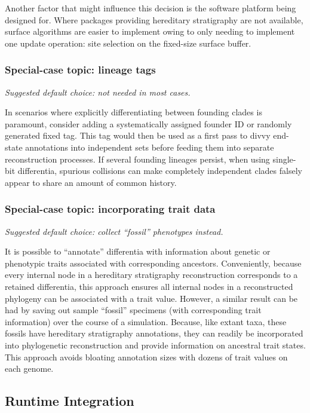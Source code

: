 Another factor that might influence this decision is the software platform being designed for.
Where packages providing hereditary stratigraphy are not available, surface algorithms are easier to implement owing to only needing to implement one update operation: site selection on the fixed-size surface buffer.

\subsubsection{Special-case topic: lineage tags}
\textit{Suggested default choice: not needed in most cases.}

In scenarios where explicitly differentiating between founding clades is paramount, consider adding a systematically assigned founder ID or randomly generated fixed tag.
This tag would then be used as a first pass to divvy end-state annotations into independent sets before feeding them into separate reconstruction processes.
If several founding lineages persist, when using single-bit differentia, spurious collisions can make completely independent clades falsely appear to share an amount of common history.

\subsubsection{Special-case topic: incorporating trait data}
\textit{Suggested default choice: collect ``fossil'' phenotypes instead.}

It is possible to ``annotate'' differentia with information about genetic or phenotypic traits associated with corresponding ancestors.
Conveniently, because every internal node in a hereditary stratigraphy reconstruction corresponds to a retained differentia, this approach ensures all internal nodes in a reconstructed phylogeny can be associated with a trait value.
However, a similar result can be had by saving out sample ``fossil'' specimens (with corresponding trait information) over the course of a simulation.
Because, like extant taxa, these fossils have hereditary stratigraphy annotations, they can readily be incorporated into phylogenetic reconstruction and provide information on ancestral trait states.
This approach avoids bloating annotation sizes with dozens of trait values on each genome.

\subsection{Runtime Integration}

